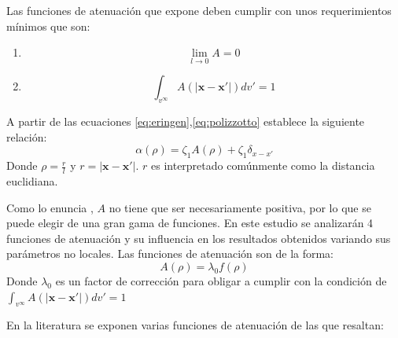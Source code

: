 Las funciones de atenuación que expone \textcite{Polizzotto2001} deben cumplir con unos requerimientos mínimos que son:

\begin{enumerate}
	\item[] \begin{equation}\lim_{l\to0}A=0\end{equation}
	\item[] \begin{equation}\int_{v^{\infty}}A(|\boldsymbol{x}-\boldsymbol{x'}|)dv'=1
	\label{eq:condicion}
	\end{equation}
\end{enumerate}

A partir de las ecuaciones \ref{eq:eringen},\ref{eq:polizzotto} \textcite{Polizzotto2001} establece la siguiente relación:
\begin{equation}
	\alpha(\rho)=\zeta_1A(\rho)+\zeta_1\delta_{x-x'}
\end{equation}
Donde $\rho=\frac{r}{l}$ y $r=|\boldsymbol{x}-\boldsymbol{x'}|$. $r$ es interpretado comúnmente como la distancia euclidiana.

Como lo enuncia \textcite{ALTAN19891271}, $A$ no tiene que ser necesariamente positiva, por lo que se puede elegir de una gran gama de funciones. En este estudio se analizarán 4 funciones de atenuación y su influencia en los resultados obtenidos variando sus parámetros no locales. Las funciones de atenuación son de la forma:
\begin{equation}
	A(\rho)=\lambda_0f(\rho)
\end{equation}
Donde $\lambda_0$ es un factor de corrección para obligar a cumplir con la condición de $\int_{v^{\infty}}A(|\boldsymbol{x}-\boldsymbol{x'}|)dv'=1$

En la literatura se exponen varias funciones de atenuación de las que resaltan:

